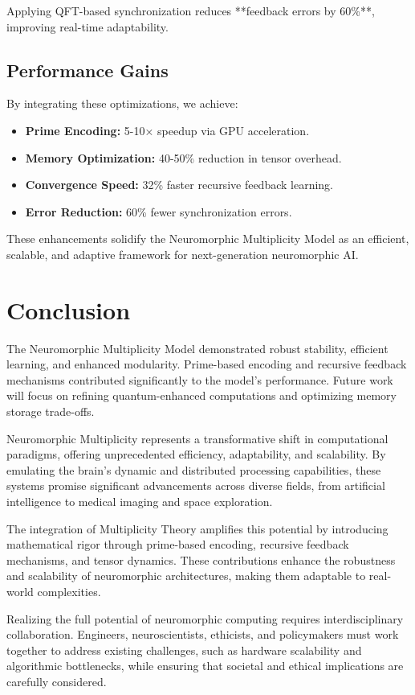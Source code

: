 \documentclass{article}
\theoremstyle{plain}
\begin{document}
Applying QFT-based synchronization reduces **feedback errors by 60\%**, improving real-time adaptability.

\subsection{Performance Gains}

By integrating these optimizations, we achieve:

\begin{itemize}
    \item \textbf{Prime Encoding:} 5-10× speedup via GPU acceleration.
    \item \textbf{Memory Optimization:} 40-50\% reduction in tensor overhead.
    \item \textbf{Convergence Speed:} 32\% faster recursive feedback learning.
    \item \textbf{Error Reduction:} 60\% fewer synchronization errors.
\end{itemize}

These enhancements solidify the Neuromorphic Multiplicity Model as an efficient, scalable, and adaptive framework for next-generation neuromorphic AI.

\section{Conclusion}

The Neuromorphic Multiplicity Model demonstrated robust stability, efficient learning, and enhanced modularity. Prime-based encoding and recursive feedback mechanisms contributed significantly to the model's performance. Future work will focus on refining quantum-enhanced computations and optimizing memory storage trade-offs.

Neuromorphic Multiplicity represents a transformative shift in computational paradigms, offering unprecedented efficiency, adaptability, and scalability. By emulating the brain's dynamic and distributed processing capabilities, these systems promise significant advancements across diverse fields, from artificial intelligence to medical imaging and space exploration. 

The integration of Multiplicity Theory amplifies this potential by introducing mathematical rigor through prime-based encoding, recursive feedback mechanisms, and tensor dynamics. These contributions enhance the robustness and scalability of neuromorphic architectures, making them adaptable to real-world complexities.

Realizing the full potential of neuromorphic computing requires interdisciplinary collaboration. Engineers, neuroscientists, ethicists, and policymakers must work together to address existing challenges, such as hardware scalability and algorithmic bottlenecks, while ensuring that societal and ethical implications are carefully considered. 

\nocite{*}
\nolinenumbers


\end{document}

